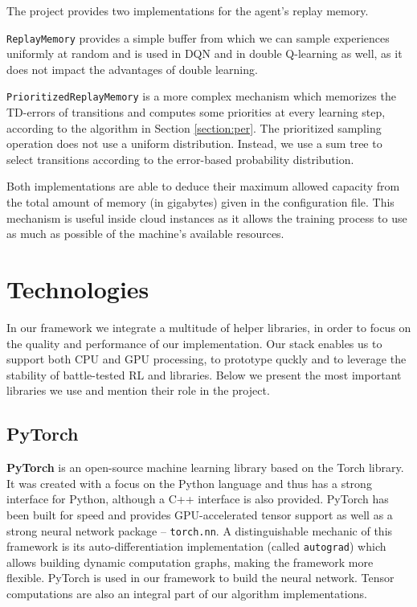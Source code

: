 The project provides two implementations for the agent’s replay memory.

\texttt{ReplayMemory} provides a simple buffer from which we can sample experiences uniformly at random and is used in DQN and in double Q-learning as well, as it does not impact the advantages of double learning.

\texttt{PrioritizedReplayMemory} is a more complex mechanism which memorizes the TD-errors of transitions and computes some priorities at every learning step, according to the algorithm in Section \ref{section:per}.
The prioritized sampling operation does not use a uniform distribution.
Instead, we use a sum tree to select transitions according to the error-based probability distribution.

Both implementations are able to deduce their maximum allowed capacity from the total amount of memory (in gigabytes) given in the configuration file.
This mechanism is useful inside cloud instances as it allows the training process to use as much as possible of the machine's available resources.

\section{Technologies} \label{section:technologies}
In our framework we integrate a multitude of helper libraries, in order to focus on the quality and performance of our implementation.
Our stack enables us to support both CPU and GPU processing, to prototype quckly and to leverage the stability of battle-tested RL and libraries.
Below we present the most important libraries we use and mention their role in the project.

\subsection*{PyTorch}
\textbf{PyTorch} is an open-source machine learning library based on the Torch library.
It was created with a focus on the Python language \cite{pytorch-book} and thus has a strong interface for Python, although a C++ interface is also provided.
PyTorch has been built for speed and provides GPU-accelerated tensor support as well as a strong neural network package -- \verb|torch.nn|.
A distinguishable mechanic of this framework is its auto-differentiation implementation (called \texttt{autograd}) which allows building dynamic computation graphs, making the framework more flexible.
PyTorch is used in our framework to build the neural network.
Tensor computations are also an integral part of our algorithm implementations.

